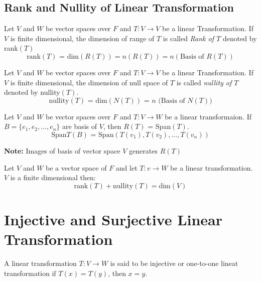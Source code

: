 \documentclass[english,course,fleqn]{lecture}
\begin{document}
\subsection{Rank and Nullity of Linear Transformation}


\begin{definition}[Rank of $T$]
  
Let $V$ and $W$ be vector spaces over $F$ and $T:V\rightarrow V$ be a linear Transformation.
If $V$ is finite dimensional, the dimension of range of $T$ is called \textit{Rank of $T$} denoted by rank$(T)$
  \[
  \text{rank$(T)$ = dim$(R(T))$} = n(R(T)) = n(\text{Basis of $R(T)$})
\]
\end{definition}


\begin{definition}[Nullity of $T$]
  
  Let $V$ and $W$ be vector spaces over $F$ and $T:V\rightarrow V$ be a linear Transformation.
  If $V$ is finite dimensional, the dimension of  null space of $T$ is called \textit{nullity of $T$} denoted by nullity$(T)$.
  \[
    \text{nullity$(T)$ = dim$(N(T))$ = $n$ (Basis of $N(T)$)}
  \]
\end{definition}


\begin{definition}[Span$(T)$]
  Let $V$ and $W$ be vector spaces over $F$ and $T:V \rightarrow W$ be a linear transformaion.
  If $B = \{e_{1}, e_{2}, \ldots, e_{n}\}$ are basis of $V$, then $R(T)$ = Span$(T)$.
  \[
    \text{Span$T(B)$ = Span}(T(v_{1}), T(v_{2}), \ldots, T(v_{n}))
  \]
\end{definition}


\textbf{Note:} Images of basis of vector space $V$ generates $R(T)$

\begin{theorem}
  Let $V$ and $W$ be a vector space of $F$ and let $T:v\rightarrow W$ be a linear transformation.
  $V$ is a finite dimensional then:
  \[
    \text{rank}(T) + \text{nullity}(T) = \text{dim}(V)
  \]
\end{theorem}

\newpage

\section{Injective and Surjective Linear Transformation}

\begin{definition}
  A linear transformation $T:V \rightarrow W$ is said to be injective or one-to-one lineat transformation
  if $T(x) = T(y)$, then $x = y$.
\end{definition}
\end{document}
